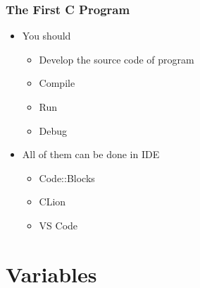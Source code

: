 \documentclass{../c-lecture}
\begin{document}
\begin{frame}
  \frametitle{The First C Program}
  \begin{itemize}
    \item You should
    \begin{itemize}
      \item Develop the source code of program
      \item Compile
      \item Run
      \item Debug
    \end{itemize}
    \item All of them can be done in IDE
    \begin{itemize}
      \item Code::Blocks
      \item CLion
      \item VS Code
    \end{itemize}
  \end{itemize}
\end{frame}

\section{Variables}
\end{document}
